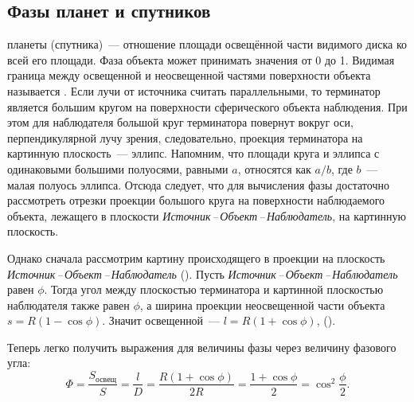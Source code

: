 \subsection{Фазы планет и спутников}

 планеты (спутника)~--- отношение площади освещённой  части видимого диска ко всей его площади. Фаза объекта может принимать значения от 0 до 1. Видимая граница между освещенной и неосвещенной частями поверхности объекта называется . Если лучи от источника считать параллельными, то терминатор является большим кругом на поверхности сферического объекта наблюдения. При этом для наблюдателя большой круг терминатора повернут вокруг оси, перпендикулярной лучу зрения, следовательно, проекция терминатора на картинную плоскость~--- эллипс. Напомним, что площади круга и эллипса с одинаковыми большими полуосями, равными $a$, относятся как $a/b$, где $b$~--- малая полуось эллипса. Отсюда следует, что для вычисления фазы достаточно рассмотреть отрезки проекции большого круга на поверхности наблюдаемого объекта, лежащего в плоскости {\slshape Источник\,--\,Объект\,--\,Наблюдатель}, на картинную плоскость.


Однако сначала рассмотрим картину происходящего в проекции на плоскость {\slshape Источник\,--\,Объект\,--\,Наблюдатель} (). Пусть  {\slshape Источник\,--\,Объект\,--\,Наблюдатель} равен $\phi$. Тогда угол между плоскостью терминатора и картинной плоскостью наблюдателя также равен $\phi$, а ширина проекции неосвещенной части объекта $s = R(1 - \cos \phi)$. Значит освещенной~--- $l = R( 1+ \cos \phi)$, ().

Теперь легко получить выражения для величины фазы через величину фазового угла:
\begin{equation}
    \Phi = \frac{S_\text{освещ}}{S} = \frac{l}{D} = \frac{R ( 1 + \cos \phi )}{2R} = \frac{1 + \cos \phi}{2} =  \cos^2 \frac{\phi}{2}.
\end{equation}

